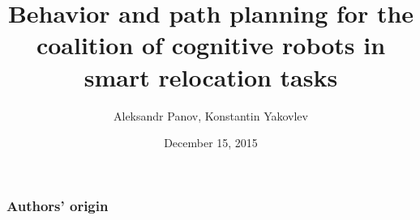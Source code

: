 \documentclass[default]{beamer}
\begin{document}
	
	\title[RiTA'2015 -- Behavior and path planning]{Behavior and path planning for the coalition of cognitive robots in smart relocation tasks}
	\author[Panov, Yakovlev]{Aleksandr Panov, Konstantin Yakovlev}
	
	\date{December 15, 2015} 
	
	\begin{frame}
		\titlepage
	\end{frame}
	
	\begin{frame}
		\frametitle{Authors' origin}
		\begin{tikzpicture}
			
		\end{tikzpicture}
				

\end{frame}
\end{document}
